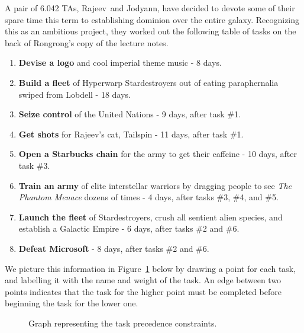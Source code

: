 
\begin{pcomments}
\end{pcomments}


\newcommand{\Jay}{Rajeev}
\newcommand{\Rongrong}{Jodyann}


\begin{problem}
A pair of 6.042 TAs, \Jay\  and \Rongrong,
have decided to devote some of their spare time this term to
establishing dominion over the entire galaxy.  Recognizing this as an
ambitious project, they worked out the following table of tasks on the
back of Rongrong's copy of the lecture notes.

\begin{enumerate}
\item {\bf Devise a logo} and cool imperial theme music - 8 days.
\item {\bf Build a fleet} of Hyperwarp Stardestroyers out of eating
  paraphernalia swiped from Lobdell - 18 days.
\item {\bf Seize control} of the United Nations - 9 days, after task \#1.
\item {\bf Get shots} for \Jay's cat, Tailspin - 11 days, after task \#1.
\item {\bf Open a Starbucks chain} for the army to get their caffeine - 10 
days, after task \#3.
\item {\bf Train an army} of elite interstellar warriors by dragging
people to see {\em The Phantom Menace} dozens of times - 4 days, after
tasks \#3, \#4, and \#5.
\item {\bf Launch the fleet} of Stardestroyers, crush all sentient
alien species, and establish a Galactic Empire - 6 days, after tasks \#2 and
\#6.
\item {\bf Defeat Microsoft} - 8 days, after tasks \#2 and \#6.
\end{enumerate}

We picture this information in Figure~\ref{fig:tasks} below by drawing a
point for each task, and labelling it with the name and weight of the
task.  An edge between two points indicates that the task for the higher
point must be completed before beginning the task for the lower one.
    \begin{figure}[htbp]
    \begin{center}
    \unitlength=0.047pt
    
    \end{center}
    \caption{Graph representing the task precedence constraints.}
    \label{fig:tasks}
    \end{figure}


\end{problem}
